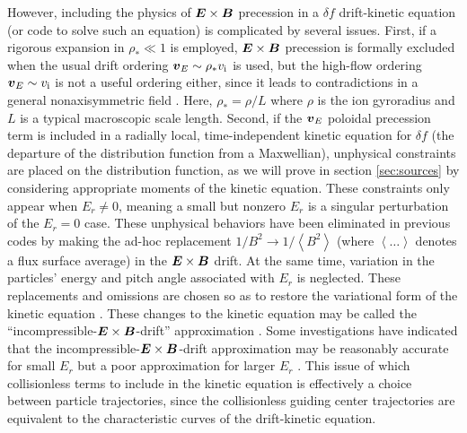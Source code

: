 \documentclass[12pt,superscriptaddress]{revtex4}
\newcommand{\vect}[1]{\mbox{\boldmath $#1$}}
\newcommand{\vi}{v_{\mathrm{i}}}
\begin{document}
However, including the physics of $\vect{E}\times\vect{B}$ precession in a $\delta\! f$ drift-kinetic equation (or code to
solve such an equation)
is complicated by several issues.
First, if a rigorous expansion in $\rho_* \ll 1$ is employed, 
$\vect{E}\times\vect{B}$ precession is formally excluded
when the usual drift ordering $\vect{v}_E \sim \rho_* \vi$ is used,
but the high-flow ordering $\vect{v}_E \sim \vi$ is
not a useful ordering either, since it leads to contradictions in a general nonaxisymmetric field \cite{HelanderRotation, SugamaHighFlow}.
Here, $\rho_* = \rho/L$ where $\rho$ is the ion gyroradius and $L$ is a typical
macroscopic scale length.
Second, if the $\vect{v}_{E}$ poloidal precession term
is included in a radially local, time-independent kinetic equation
for $\delta\! f$ (the departure of the distribution function from a Maxwellian),
unphysical constraints are placed on the distribution function,
as we will prove in section \ref{sec:sources}
by considering appropriate moments of the kinetic equation.
These constraints only appear when $E_r \ne 0$, meaning a small but nonzero
$E_r$ is a singular perturbation of the $E_r=0$ case.
These unphysical behaviors have been eliminated in previous codes\cite{BeidlerBigBenchmarking}
by making the ad-hoc replacement $1/B^2 \to 1/\left< B^2 \right>$ (where $\left< \ldots \right>$ denotes
a flux surface average) in the $\vect{E}\times\vect{B}$ drift.
At the same time, variation in the particles' energy and pitch angle associated with $E_r$ is neglected.
These replacements and omissions are chosen so as to restore the variational form of the kinetic equation  \cite{DKES1, DKES2}.
These changes to the kinetic equation may be called the ``incompressible-$\vect{E}\times\vect{B}$-drift''
approximation \cite{Beidler}.
Some investigations have indicated that the incompressible-$\vect{E}\times\vect{B}$-drift
approximation may be reasonably accurate for small $E_r$ but a poor approximation
for larger $E_r$ \cite{Beidler, meMonoenergetic}.
This issue of which collisionless terms to include in the kinetic equation
is effectively a choice between particle trajectories, since the collisionless guiding center trajectories
are equivalent to the characteristic curves of the drift-kinetic equation.
\end{document}
